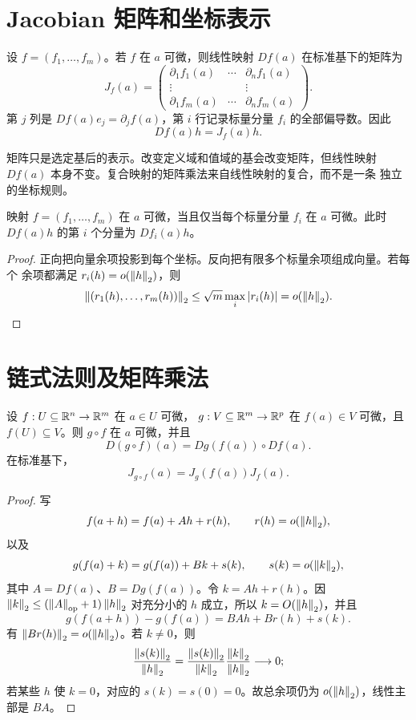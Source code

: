 \section{Jacobian 矩阵和坐标表示}

设 \(f=(f_1,\ldots,f_m)\)。若 \(f\) 在 \(a\) 可微，则线性映射
\(Df(a)\) 在标准基下的矩阵为
\[
 J_f(a)=
 \begin{pmatrix}
  \partial_1f_1(a)&\cdots&\partial_nf_1(a)\\
  \vdots&&\vdots\\
  \partial_1f_m(a)&\cdots&\partial_nf_m(a)
 \end{pmatrix}.
\]
第 \(j\) 列是 \(Df(a)e_j=\partial_jf(a)\)，第 \(i\) 行记录标量分量
\(f_i\) 的全部偏导数。因此
\[
 Df(a)h=J_f(a)h.
\]

矩阵只是选定基后的表示。改变定义域和值域的基会改变矩阵，但线性映射
\(Df(a)\) 本身不变。复合映射的矩阵乘法来自线性映射的复合，而不是一条
独立的坐标规则。

\begin{proposition}[分量判据]
\label{prop:frechet-componentwise}
映射 \(f=(f_1,\ldots,f_m)\) 在 \(a\) 可微，当且仅当每个标量分量
\(f_i\) 在 \(a\) 可微。此时 \(Df(a)h\) 的第 \(i\) 个分量为
\(Df_i(a)h\)。
\end{proposition}

\begin{proof}
正向把向量余项投影到每个坐标。反向把有限多个标量余项组成向量。若每个
余项都满足 $r_i(h)=o(\left\lVert h\right\rVert_2)$，则
\[
 \left\lVert(r_1(h),\ldots,r_m(h))\right\rVert_2
 \le\sqrt m\max_i|r_i(h)|=o(\left\lVert h\right\rVert_2).
\]
\end{proof}

\section{链式法则及矩阵乘法}

\begin{theorem}[多元链式法则]
\label{thm:multivariable-chain-rule}
设 \(f:U\subseteq\mathbb{R}^n\to\mathbb{R}^m\) 在 \(a\in U\) 可微，
\(g:V\subseteq\mathbb{R}^m\to\mathbb{R}^p\) 在 \(f(a)\in V\) 可微，且
\(f(U)\subseteq V\)。则 \(g\circ f\) 在 \(a\) 可微，并且
\[
 D(g\circ f)(a)=Dg(f(a))\circ Df(a).
\]
在标准基下，
\[
 J_{g\circ f}(a)=J_g(f(a))J_f(a).
\]
\end{theorem}

\begin{proof}
写
\[
 f(a+h)=f(a)+Ah+r(h),\qquad r(h)=o(\left\lVert h\right\rVert_2),
\]
以及
\[
 g(f(a)+k)=g(f(a))+Bk+s(k),\qquad s(k)=o(\left\lVert k\right\rVert_2),
\]
其中 \(A=Df(a)\)、\(B=Dg(f(a))\)。令 \(k=Ah+r(h)\)。因
\(\left\lVert k\right\rVert_2\le(\left\lVert A\right\rVert_{\mathrm{op}}+1)\left\lVert h\right\rVert_2\) 对充分小的 \(h\)
成立，所以 \(k=O(\left\lVert h\right\rVert_2)\)，并且
\[
 g(f(a+h))-g(f(a))
 =BAh+Br(h)+s(k).
\]
有 \(\left\lVert Br(h)\right\rVert_2=o(\left\lVert h\right\rVert_2)\)。若 \(k\ne0\)，则
\[
 \frac{\left\lVert s(k)\right\rVert_2}{\left\lVert h\right\rVert_2}
 =\frac{\left\lVert s(k)\right\rVert_2}{\left\lVert k\right\rVert_2}
  \frac{\left\lVert k\right\rVert_2}{\left\lVert h\right\rVert_2}\longrightarrow0;
\]
若某些 \(h\) 使 \(k=0\)，对应的 \(s(k)=s(0)=0\)。故总余项仍为
\(o(\left\lVert h\right\rVert_2)\)，线性主部是 \(BA\)。
\end{proof}

